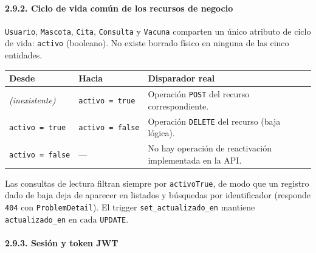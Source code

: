 \documentclass[
  spanish,
]{article}
\newcounter{none} %
\begin{document}
\paragraph{2.9.2. Ciclo de vida común de los recursos de
negocio}\label{ciclo-de-vida-comuxfan-de-los-recursos-de-negocio}

\texttt{Usuario}, \texttt{Mascota}, \texttt{Cita}, \texttt{Consulta} y
\texttt{Vacuna} comparten un único atributo de ciclo de vida:
\texttt{activo} (booleano). No existe borrado físico en ninguna de las
cinco entidades.

{\def\LTcaptype{none} %
\begin{longtable}[]{@{}
  >{\raggedright\arraybackslash}p{}
  >{\raggedright\arraybackslash}p{}
  >{\raggedright\arraybackslash}p{}@{}}
\toprule\noalign{}
\begin{minipage}[b]{\linewidth}\raggedright
Desde
\end{minipage} & \begin{minipage}[b]{\linewidth}\raggedright
Hacia
\end{minipage} & \begin{minipage}[b]{\linewidth}\raggedright
Disparador real
\end{minipage} \\
\midrule\noalign{}
\endhead
\bottomrule\noalign{}
\endlastfoot
\emph{(inexistente)} & \texttt{activo\ =\ true} & Operación
\texttt{POST} del recurso correspondiente. \\
\texttt{activo\ =\ true} & \texttt{activo\ =\ false} & Operación
\texttt{DELETE} del recurso (baja lógica). \\
\texttt{activo\ =\ false} & --- & No hay operación de reactivación
implementada en la API. \\
\end{longtable}
}

Las consultas de lectura filtran siempre por \texttt{activo\allowbreak{}True}, de
modo que un registro dado de baja deja de aparecer en listados y
búsquedas por identificador (responde \texttt{404} con
\texttt{Problem\allowbreak{}Detail}). El trigger \texttt{set\_\allowbreak{}actualizado\_\allowbreak{}en}
mantiene \texttt{actualizado\_\allowbreak{}en} en cada \texttt{UPDATE}.

\paragraph{2.9.3. Sesión y token JWT}\label{sesiuxf3n-y-token-jwt}
\end{document}
